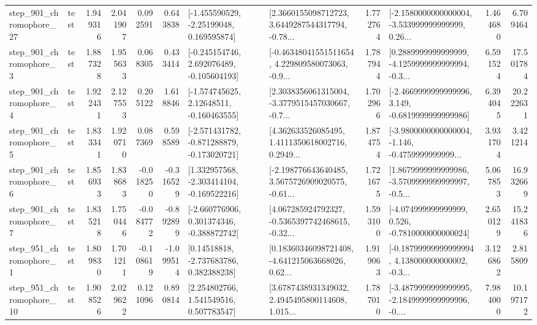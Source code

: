 \begin{tabular}{llrrrrllrlrr}
  step\_901\_chromophore\_27 &      test &      1.949316 &    2.041907 &      0.092591 &  0.643838 &    [-1.455590529, -2.25199048, 0.169595874] &  [2.3660155098712723, 3.6449287544317794, -0.78... &       1.772764 &  [-2.1580000000000004, -3.533999999999999, 0.26... &            1.464680 &          6.709464 \\
   step\_901\_chromophore\_3 &      test &      1.887328 &    1.955633 &      0.068305 &  0.433414 &   [-0.245154746, 2.692076489, -0.105604193] &  [-0.46348041551511654, 4.229809580073063, -0.9... &       1.787944 &  [0.2889999999999999, -4.1259999999999994, -0.3... &            6.591524 &         17.501784 \\
   step\_901\_chromophore\_4 &      test &      1.922431 &    2.127553 &      0.205122 &  1.618846 &    [-1.574745625, 2.12648511, -0.160463555] &  [2.3038356061315004, -3.3779515457030667, -0.7... &       1.702966 &  [-2.4669999999999996, 3.149, -0.6819999999999986] &            6.394045 &         20.222631 \\
   step\_901\_chromophore\_5 &      test &      1.833341 &    1.920710 &      0.087369 &  0.598589 &  [-2.571431782, -0.871288879, -0.173020721] &  [4.362633526085495, 1.4111350618002716, 0.2949... &       1.874754 &  [-3.9800000000000004, -1.146, -0.4759999999999... &            3.931704 &          3.421214 \\
   step\_901\_chromophore\_6 &      test &      1.856933 &    1.838683 &     -0.018250 & -0.316529 &   [1.332957568, -2.303414104, -0.169522216] &  [-2.198776643640485, 3.5675726909020575, -0.61... &       1.721675 &  [1.8679999999999986, -3.5709999999999997, -0.5... &            5.067853 &         16.932669 \\
   step\_901\_chromophore\_7 &      test &      1.835218 &    1.750446 &     -0.084772 & -0.892899 &   [-2.660776906, 0.301374346, -0.388872742] &  [4.067285924792327, -0.5365397742468615, -0.32... &       1.593100 &   [-4.074999999999999, 0.526, -0.7810000000000024] &            2.650129 &         15.241836 \\
   step\_951\_chromophore\_1 &      test &      1.809830 &    1.701211 &     -0.108619 & -1.099514 &     [0.14518818, -2.737683786, 0.382388238] &  [0.18360346098721408, -4.641215063668026, 0.62... &       1.919063 &  [-0.18799999999999994, 4.138000000000002, -0.3... &            3.126862 &          2.815809 \\
  step\_951\_chromophore\_10 &      test &      1.908526 &    2.029622 &      0.121096 &  0.890814 &     [2.254802766, 1.541549516, 0.507783547] &  [3.6787438931349032, 2.4945495800114608, 1.015... &       1.787010 &  [-3.4879999999999995, -2.1849999999999996, -0.... &            7.984000 &         10.197172 \\

\end{tabular}
